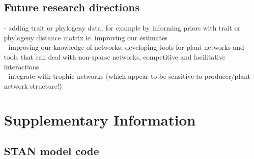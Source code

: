 \documentclass[a4,12pt]{article}
\begin{document}
    \subsection{Future research directions}

    
    - adding trait or phylogeny data, for example by informing priors with trait or phylogeny distance matrix
    ie. improving our estimates \\
    - improving our knowledge of networks, developing tools for plant networks and tools that can deal with non-sparse networks, competitive and facilitative interactions \\
    - integrate with trophic networks (which appear to be sensitive to producer/plant network structure!)\\

    

\section{Supplementary Information}

    \subsection{STAN model code}

     
\end{document}
